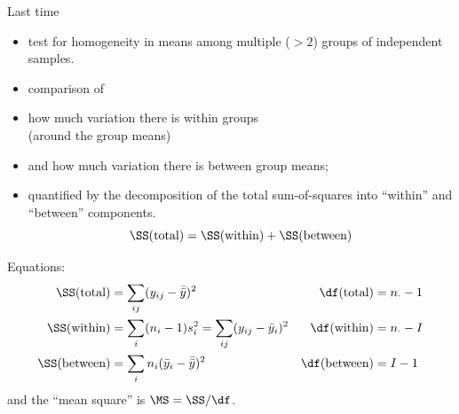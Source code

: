 %
%
%



\subtitle{and two-way ANOVA}

\date{16 November 2015}




\begin{frame}
  \maketitle
\end{frame}



\begin{frame}{Last time}
  \begin{itemize}
    \item {} test for homogeneity in means among multiple ($>2$) groups of independent samples.
    \item {} comparison of 
      \item how much variation there is within groups \\
        (around the group means)
      \item and how much variation there is between group means;
      \item quantified by the decomposition of the total sum-of-squares into ``within'' and ``between'' components.
          \[ 
       \SS(\text{total})  = \SS(\text{within}) + \SS(\text{between})  
   \]
  \end{itemize}

  Equations:
    \begin{align*}
        \SS(\text{total}) &= \sum_{ij} (y_{ij} - \bar {\bar y} )^2 
    &  \df(\text{total}) &= n_\cdot - 1 \\
      \SS(\text{within}) &= \sum_{i} (n_i-1) s_i^2 = \sum_{ij} (y_{ij}-\bar y_i)^2 
   &   \df(\text{within}) &= n_\cdot - I \\
      \SS(\text{between}) &= \sum_{i} n_i (\bar y_i - \bar{\bar y})^2 
      & \df(\text{between}) &= I - 1 \\
    \end{align*}
    and the ``mean square'' is $\MS = \SS / \df$.
    
\end{frame}


